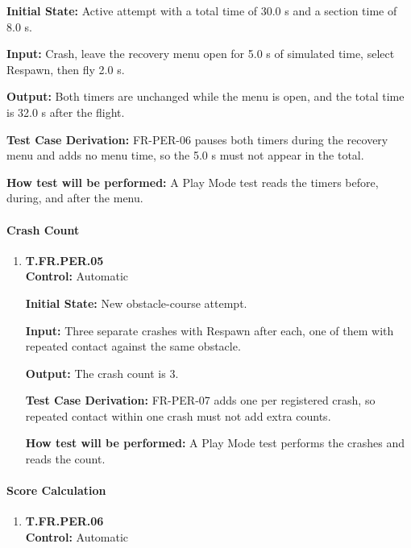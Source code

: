 \documentclass[12pt, titlepage]{article}
\begin{document}
{\begin{enumerate}
\textbf{Initial State:} Active attempt with a total time of 30.0 s and a section time of
8.0 s.

\textbf{Input:} Crash, leave the recovery menu open for 5.0 s of simulated time, select
Respawn, then fly 2.0 s.

\textbf{Output:} Both timers are unchanged while the menu is open, and the total time is
32.0 s after the flight.

\textbf{Test Case Derivation:} \mbox{FR-PER-06} pauses both timers during the recovery
menu and adds no menu time, so the 5.0 s must not appear in the total.

\textbf{How test will be performed:} A Play Mode test reads the timers before, during,
and after the menu.

\end{enumerate}

\paragraph{Crash Count}

\begin{enumerate}

\item{\hypertarget{test-fr-per-05}{}\textbf{T.FR.PER.05}\\}
\textbf{Control:} Automatic

\textbf{Initial State:} New obstacle-course attempt.

\textbf{Input:} Three separate crashes with Respawn after each, one of them with
repeated contact against the same obstacle.

\textbf{Output:} The crash count is 3.

\textbf{Test Case Derivation:} \mbox{FR-PER-07} adds one per registered crash, so
repeated contact within one crash must not add extra counts.

\textbf{How test will be performed:} A Play Mode test performs the crashes and reads the
count.

\end{enumerate}

\paragraph{Score Calculation}

\begin{enumerate}

\item{\hypertarget{test-fr-per-06}{}\textbf{T.FR.PER.06}\\}
\textbf{Control:} Automatic


\end{enumerate}}
\end{document}
